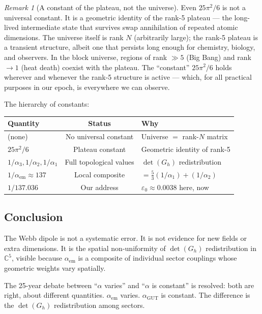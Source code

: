 \documentclass[12pt]{article}
\theoremstyle{remark}
\newtheorem{remark}[theorem]{Remark}
\theoremstyle{definition}
\newcommand{\CC}{\mathbb{C}}
\newcommand{\agut}{\alpha_{\mathrm{GUT}}}
\begin{document}
\begin{remark}[A constant of the plateau, not the universe]
Even $25\pi^2/6$ is not a universal constant. It is a geometric identity of the rank-5 plateau --- the long-lived intermediate state that survives swap annihilation of repeated atomic dimensions. The universe itself is rank $N$ (arbitrarily large); the rank-5 plateau is a transient structure, albeit one that persists long enough for chemistry, biology, and observers. In the block universe, regions of rank $\gg 5$ (Big Bang) and rank $\to 1$ (heat death) coexist with the plateau. The ``constant'' $25\pi^2/6$ holds wherever and whenever the rank-5 structure is active --- which, for all practical purposes in our epoch, is everywhere we can observe.

The hierarchy of constants:

\begin{center}
\begin{tabular}{lcl}
\hline
Quantity & Status & Why \\
\hline
(none) & No universal constant & Universe $=$ rank-$N$ matrix \\
$25\pi^2/6$ & Plateau constant & Geometric identity of rank-5 \\
$1/\alpha_3, 1/\alpha_2, 1/\alpha_1$ & Full topological values & $\det(G_h)$ redistribution \\
$1/\alpha_\text{em} \approx 137$ & Local composite & $= \tfrac{5}{3}(1/\alpha_1) + (1/\alpha_2)$ \\
$1/137.036$ & Our address & $\varepsilon_0 \approx 0.0038$ here, now \\
\hline
\end{tabular}
\end{center}
\end{remark}

\subsection{Conclusion}

The Webb dipole is not a systematic error. It is not evidence for new fields or extra dimensions. It is the spatial non-uniformity of $\det(G_h)$ redistribution in $\CC^5$, visible because $\alpha_\text{em}$ is a composite of individual sector couplings whose geometric weights vary spatially.

The 25-year debate between ``$\alpha$ varies'' and ``$\alpha$ is constant'' is resolved: both are right, about different quantities. $\alpha_\text{em}$ varies. $\agut$ is constant. The difference is the $\det(G_h)$ redistribution among sectors.
\end{document}
